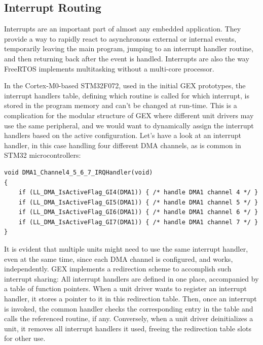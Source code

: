 \subsection{Interrupt Routing} \label{sec:irq-routing}

Interrupts are an important part of almost any embedded application. They provide a way to rapidly react to asynchronous external or internal events, temporarily leaving the main program, jumping to an interrupt handler routine, and then returning back after the event is handled. Interrupts are also the way FreeRTOS implements multitasking without a multi-core processor.

In the Cortex-M0-based STM32F072, used in the initial GEX prototypes, the interrupt handlers table, defining which routine is called for which interrupt, is stored in the program memory and can't be changed at run-time. This is a complication for the modular structure of GEX where different unit drivers may use the same peripheral, and we would want to dynamically assign the interrupt handlers based on the active configuration. Let's have a look at an interrupt handler, in this case handling four different \gls{DMA} channels, as is common in STM32 microcontrollers:

\begin{verbatim}
void DMA1_Channel4_5_6_7_IRQHandler(void)
{
    if (LL_DMA_IsActiveFlag_GI4(DMA1)) { /* handle DMA1 channel 4 */ }
    if (LL_DMA_IsActiveFlag_GI5(DMA1)) { /* handle DMA1 channel 5 */ }
    if (LL_DMA_IsActiveFlag_GI6(DMA1)) { /* handle DMA1 channel 6 */ }
    if (LL_DMA_IsActiveFlag_GI7(DMA1)) { /* handle DMA1 channel 7 */ }
}
\end{verbatim}

It is evident that multiple units might need to use the same interrupt handler, even at the same time, since each \gls{DMA} channel is configured, and works, independently. GEX implements a redirection scheme to accomplish such interrupt sharing: All interrupt handlers are defined in one place, accompanied by a table of function pointers. When a unit driver wants to register an interrupt handler, it stores a pointer to it in this redirection table. Then, once an interrupt is invoked, the common handler checks the corresponding entry in the table and calls the referenced routine, if any. Conversely, when a unit driver deinitializes a unit, it removes all interrupt handlers it used, freeing the redirection table slots for other use.











